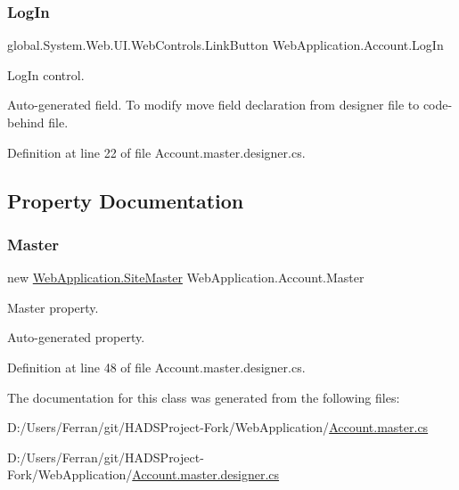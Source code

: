 \mbox{\label{classWebApplication_1_1Account_acf1883724583703dee1d49d5e7f8c9c8}} 
\subsubsection{\texorpdfstring{LogIn}{LogIn}}
{\footnotesize\ttfamily global.\+System.\+Web.\+U\+I.\+Web\+Controls.\+Link\+Button Web\+Application.\+Account.\+Log\+In\hspace{0.3cm}{\ttfamily [protected]}}



Log\+In control. 

Auto-\/generated field. To modify move field declaration from designer file to code-\/behind file. 

Definition at line 22 of file Account.\+master.\+designer.\+cs.



\subsection{Property Documentation}
\mbox{\label{classWebApplication_1_1Account_adc7988cc207da465340c81ceeda4c7cf}} 
\subsubsection{\texorpdfstring{Master}{Master}}
{\footnotesize\ttfamily new \mbox{\hyperlink{classWebApplication_1_1SiteMaster}{Web\+Application.\+Site\+Master}} Web\+Application.\+Account.\+Master\hspace{0.3cm}{\ttfamily [get]}}



Master property. 

Auto-\/generated property. 

Definition at line 48 of file Account.\+master.\+designer.\+cs.



The documentation for this class was generated from the following files\+:\begin{DoxyCompactItemize}
\item 
D\+:/\+Users/\+Ferran/git/\+H\+A\+D\+S\+Project-\/\+Fork/\+Web\+Application/\mbox{\hyperlink{Account_8master_8cs}{Account.\+master.\+cs}}\item 
D\+:/\+Users/\+Ferran/git/\+H\+A\+D\+S\+Project-\/\+Fork/\+Web\+Application/\mbox{\hyperlink{Account_8master_8designer_8cs}{Account.\+master.\+designer.\+cs}}\end{DoxyCompactItemize}
